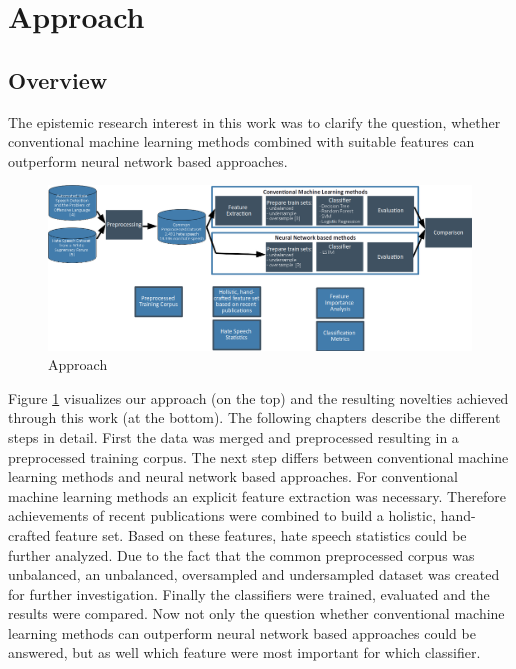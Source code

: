 \section{Approach} 
\label{approach}

\subsection{Overview} 
\label{ch:approach0}

The epistemic research interest in this work was to clarify the question, whether conventional machine learning methods combined with suitable features can outperform neural network based approaches.

\begin{figure}[ht]
	\centering
	\includegraphics[width=1.0\linewidth]{figures/pipeline.png}
	\caption{Approach}
	\label{fig:overall_pipeline}
\end{figure}

Figure \ref{fig:overall_pipeline} visualizes our approach (on the top) and the resulting novelties achieved through this work (at the bottom). The following chapters describe the different steps in detail. First the data was merged and preprocessed resulting in a preprocessed training corpus. The next step differs between conventional machine learning methods and neural network based approaches. For conventional machine learning methods an explicit feature extraction was necessary. Therefore achievements of recent publications were combined to build a holistic, hand-crafted feature set. Based on these features, hate speech statistics could be further analyzed. Due to the fact that the common preprocessed corpus was unbalanced, an unbalanced, oversampled and under\-sampled dataset was created for further investigation. Finally the classifiers were trained, evaluated and the results were compared. Now not only the question whether conventional machine learning methods can outperform neural net\-work based approaches could be answered, but as well which feature were most important for which classifier.

